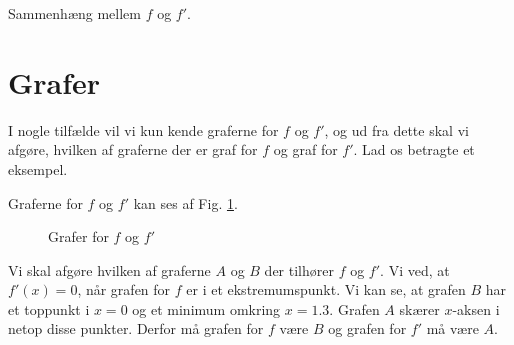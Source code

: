 \documentclass[12pt]{article}
\begin{document}






\begin{center}
\Huge
Sammenhæng mellem $f$ og $f'$.
\end{center}

\section*{Grafer}

I nogle tilfælde vil vi kun kende graferne for $f$ og $f'$, og ud fra dette skal vi afgøre, hvilken af graferne der er graf for $f$ og graf for $f'$. Lad os betragte et eksempel.
\begin{exa}
	Graferne for $f$ og $f'$ kan ses af Fig. \ref{fig:grafer}.
	\begin{figure}[H]
		\centering
		\caption{Grafer for $f$ og $f'$}
		\label{fig:grafer}
	\end{figure}
	Vi skal afgøre hvilken af graferne $A$ og $B$ der tilhører $f$ og $f'$. Vi ved, at $f'(x) = 0$, når grafen for $f$ er i et ekstremumspunkt. Vi kan se, at grafen $B$ har et toppunkt i $x=0$ og et 
	minimum omkring $x=1.3$. Grafen $A$ skærer $x$-aksen i netop disse punkter. Derfor må grafen for $f$ være $B$ og grafen for $f'$ må være $A$. 
\end{exa}
\end{document}
